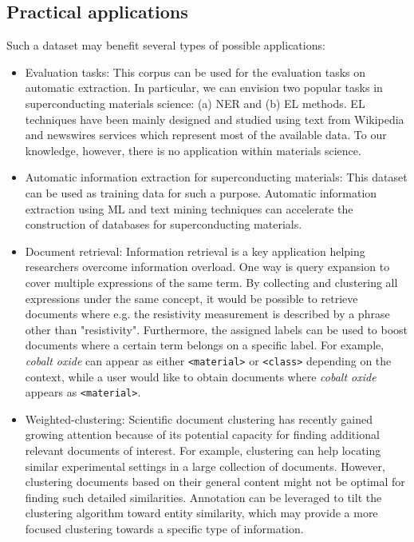 \documentclass[fleqn,10pt]{wlscirep}
\begin{document}
\subsection*{Practical applications}
Such a dataset may benefit several types of possible applications: 

\begin{itemize}
    \item Evaluation tasks: This corpus can be used for the evaluation tasks on automatic extraction. In particular, we can envision two popular tasks in superconducting materials science: (a) NER and (b) EL methods. EL techniques have been mainly designed and studied using text from Wikipedia and newswires services which represent most of the available data. 
    To our knowledge, however, there is no application within materials science.
    \item Automatic information extraction for superconducting materials: This dataset can be used as training data for such a purpose. 
    Automatic information extraction using ML and text mining techniques can accelerate the construction of databases for superconducting materials.
    \item Document retrieval: Information retrieval is a key application helping researchers overcome information overload.
    One way is query expansion to cover multiple expressions of the same term. 
    By collecting and clustering all expressions under the same concept, it would be possible to retrieve documents where e.g. the resistivity measurement is described by a phrase other than "resistivity". 
    Furthermore, the assigned labels can be used to boost documents where a certain term belongs on a specific label. 
    For example, \textit{cobalt oxide} can appear as either \texttt{<material>} or \texttt{<class>} depending on the context, while a user would like to obtain documents where \textit{cobalt oxide} appears as \texttt{<material>}.
    \item Weighted-clustering: Scientific document clustering has recently gained growing attention because of its potential capacity for finding additional relevant documents of interest.
    For example, clustering can help locating similar experimental settings in a large collection of documents. However, clustering documents based on their general content might not be optimal for finding such detailed similarities.
    Annotation can be leveraged to tilt the clustering algorithm toward entity similarity, which may provide a more focused clustering towards a specific type of information.
\end{itemize}
\end{document}
